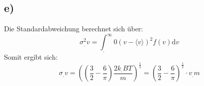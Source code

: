 \subsection*{e)}
Die Standardabweichung berechnet sich über:
\begin{equation}
  \sigma^2_.v=\int^{\infty}_.{0} \left(v-\langle v \rangle \right)^2 f(v) \text{d}v
\end{equation}
Somit ergibt sich:
\begin{equation}
  \sigma_.v = \left(\left( \frac{3}{2}- \frac{6}{\pi}\right) \frac{2k_.BT}{m}\right)^{\frac{1}{2}}=\left( \frac{3}{2}- \frac{6}{\pi}\right)^{\frac{1}{2}}\cdot v_.m
\end{equation}


